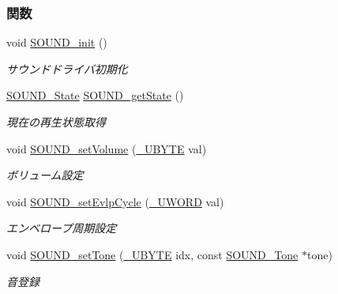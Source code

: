 \subsubsection*{関数}
\begin{DoxyCompactItemize}
\item 
void \hyperlink{sound_8h_ad3de2879fde7ab7812201bc42d3d4b8e_ad3de2879fde7ab7812201bc42d3d4b8e}{S\+O\+U\+N\+D\+\_\+init} ()
\begin{DoxyCompactList}\small\item\em サウンドドライバ初期化 \end{DoxyCompactList}\item 
\hyperlink{sound_8h_abb21e5244ee60939e8a32ec932e9d7b3_abb21e5244ee60939e8a32ec932e9d7b3}{S\+O\+U\+N\+D\+\_\+\+State} \hyperlink{sound_8h_ac4a032d84a215757679f6adca28a1d9b_ac4a032d84a215757679f6adca28a1d9b}{S\+O\+U\+N\+D\+\_\+get\+State} ()
\begin{DoxyCompactList}\small\item\em 現在の再生状態取得 \end{DoxyCompactList}\item 
void \hyperlink{sound_8h_adf9ab0e7c0d23c1addb15b92b19cda3a_adf9ab0e7c0d23c1addb15b92b19cda3a}{S\+O\+U\+N\+D\+\_\+set\+Volume} (\hyperlink{stddef_8h_aac464b47452ce9406f88ef194e2becc1_aac464b47452ce9406f88ef194e2becc1}{\+\_\+\+U\+B\+Y\+T\+E} val)
\begin{DoxyCompactList}\small\item\em ボリューム設定 \end{DoxyCompactList}\item 
void \hyperlink{sound_8h_a0d312ae4bc0fa617113f6b207948b216_a0d312ae4bc0fa617113f6b207948b216}{S\+O\+U\+N\+D\+\_\+set\+Evlp\+Cycle} (\hyperlink{stddef_8h_af4b45f5ec97da370bd2173b4fe891d76_af4b45f5ec97da370bd2173b4fe891d76}{\+\_\+\+U\+W\+O\+R\+D} val)
\begin{DoxyCompactList}\small\item\em エンベロープ周期設定 \end{DoxyCompactList}\item 
void \hyperlink{sound_8h_a96d64623d3a9b13dc1946eb89b67e6d4_a96d64623d3a9b13dc1946eb89b67e6d4}{S\+O\+U\+N\+D\+\_\+set\+Tone} (\hyperlink{stddef_8h_aac464b47452ce9406f88ef194e2becc1_aac464b47452ce9406f88ef194e2becc1}{\+\_\+\+U\+B\+Y\+T\+E} idx, const \hyperlink{sound_8h_d6/d3c/structSOUND__Tone}{S\+O\+U\+N\+D\+\_\+\+Tone} $\ast$tone)
\begin{DoxyCompactList}\small\item\em 音登録 \end{DoxyCompactList}\item 

\end{DoxyCompactItemize}
